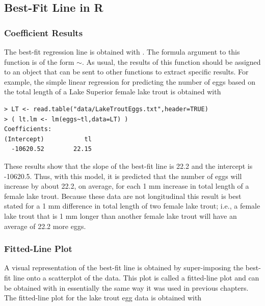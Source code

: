 \documentclass[10pt,openany]{book}\usepackage[]{graphicx}\usepackage[]{color}
\makeatletter
\newenvironment{kframe}{%
 \def\at@end@of@kframe{}%
 \ifinner\ifhmode%
  \def\at@end@of@kframe{\end{minipage}}%
  \begin{minipage}{\columnwidth}%
 \fi\fi%
 \def\FrameCommand##1{\hskip\@totalleftmargin \hskip-\fboxsep
 \colorbox{shadecolor}{##1}\hskip-\fboxsep
     \hskip-\linewidth \hskip-\@totalleftmargin \hskip\columnwidth}%
 \MakeFramed {\advance\hsize-\width
   \@totalleftmargin\z@ \linewidth\hsize
   \@setminipage}}%
 {\par\unskip\endMakeFramed%
 \at@end@of@kframe}
\newenvironment{knitrout}{}{} %
\makeatother
\begin{document}
\subsection{Best-Fit Line in R}
\subsubsection*{Coefficient Results}
The best-fit regression line is obtained with .  The formula argument to this function is of the form $\sim$.  As usual, the results of this function should be assigned to an object that can be sent to other functions to extract specific results.  For example, the simple linear regression for predicting the number of eggs based on the total length of a Lake Superior female lake trout is obtained with

\begin{knitrout}
\color{fgcolor}\begin{kframe}
\begin{verbatim}
> LT <- read.table("data/LakeTroutEggs.txt",header=TRUE)
> ( lt.lm <- lm(eggs~tl,data=LT) )
Coefficients:
(Intercept)           tl  
  -10620.52        22.15  
\end{verbatim}
\end{kframe}
\end{knitrout}

These results show that the slope of the best-fit line is 22.2 and the intercept is -10620.5.  Thus, with this model, it is predicted that the number of eggs will increase by about 22.2, on average, for each 1 mm increase in total length of a female lake trout.  Because these data are not longitudinal this result is best stated for a 1 mm difference in total length of two female lake trout; i.e., a female lake trout that is 1 mm longer than another female lake trout will have an average of 22.2 more eggs.

\subsubsection*{Fitted-Line Plot}
A visual representation of the best-fit line is obtained by super-imposing the best-fit line onto a scatterplot of the data.  This plot is called a fitted-line plot and can be obtained with  in essentially the same way it was used in previous chapters.  The fitted-line plot for the lake trout egg data  is obtained with
\end{document}
